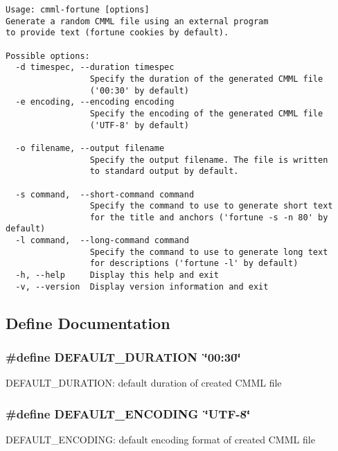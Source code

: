 \footnotesize\begin{verbatim}
Usage: cmml-fortune [options]
Generate a random CMML file using an external program
to provide text (fortune cookies by default).
 
Possible options:
  -d timespec, --duration timespec
                 Specify the duration of the generated CMML file
                 ('00:30' by default)
  -e encoding, --encoding encoding
                 Specify the encoding of the generated CMML file
                 ('UTF-8' by default)
 
  -o filename, --output filename
                 Specify the output filename. The file is written
                 to standard output by default.
 
  -s command,  --short-command command
                 Specify the command to use to generate short text
                 for the title and anchors ('fortune -s -n 80' by default)
  -l command,  --long-command command
                 Specify the command to use to generate long text
                 for descriptions ('fortune -l' by default)
  -h, --help     Display this help and exit
  -v, --version  Display version information and exit
\end{verbatim}
\normalsize


\subsection{Define Documentation}
\subsubsection{\setlength{\rightskip}{0pt plus 5cm}\#define DEFAULT\_\-DURATION\ \char`\"{}00:30\char`\"{}}\label{cmml-fortune_8c_a0}


DEFAULT\_\-DURATION: default duration of created CMML file 
\subsubsection{\setlength{\rightskip}{0pt plus 5cm}\#define DEFAULT\_\-ENCODING\ \char`\"{}UTF-8\char`\"{}}\label{cmml-fortune_8c_a1}


DEFAULT\_\-ENCODING: default encoding format of created CMML file 
